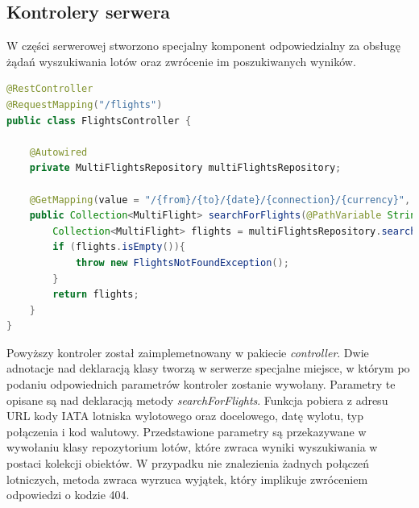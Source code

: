 \documentclass[12pt, twoside]{report}
\begin{document}
\subsection{Kontrolery serwera}
W części serwerowej stworzono specjalny komponent odpowiedzialny za obsługę żądań wyszukiwania lotów oraz zwrócenie im poszukiwanych wyników. 
\begin{lstlisting}[language=java, caption=Kontroler zwracający wyniki wyszukiwania lotów]
@RestController
@RequestMapping("/flights")
public class FlightsController {

    @Autowired
    private MultiFlightsRepository multiFlightsRepository;

    @GetMapping(value = "/{from}/{to}/{date}/{connection}/{currency}", produces = MediaType.APPLICATION_JSON_VALUE)
    public Collection<MultiFlight> searchForFlights(@PathVariable String from, @PathVariable String to, @PathVariable String date, @PathVariable String connection, @PathVariable String currency) throws AirportsNotFoundException, IOException {
        Collection<MultiFlight> flights = multiFlightsRepository.searchForMultiFlights(from, to, date, connection, currency);
        if (flights.isEmpty()){
            throw new FlightsNotFoundException();
        }
        return flights;
    }
}
\end{lstlisting}
Powyższy kontroler został zaimplemetnowany w pakiecie \textit{controller}. Dwie adnotacje nad deklaracją klasy tworzą w serwerze specjalne miejsce, w którym po podaniu odpowiednich parametrów kontroler zostanie wywołany. Parametry te opisane są nad deklaracją metody \textit{searchForFlights}. Funkcja pobiera z adresu URL kody IATA lotniska wylotowego oraz docelowego, datę wylotu, typ połączenia i kod walutowy. Przedstawione parametry są przekazywane w wywołaniu klasy repozytorium lotów, które zwraca wyniki wyszukiwania w postaci kolekcji obiektów. W przypadku nie znalezienia żadnych połączeń lotniczych, metoda zwraca wyrzuca wyjątek, który implikuje zwróceniem odpowiedzi o kodzie 404.
\end{document}
